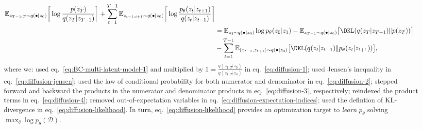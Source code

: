 \begin{align}
        \mathbb{E}_{z_{T-1:T} \sim q(\bullet \vert z_0)} \bigg[ \log \frac{p (z_T)}{q(z_T \vert z_{T-1})} \bigg] +
        \sum_{t=1}^{T-1} \mathbb{E}_{z_{t-1:t+1} \sim q(\bullet \vert z_0)} \bigg[ \log \frac{p_\theta (z_{t} \vert z_{t+1})}{q(z_t \vert z_{t-1})}\bigg]
    \label{eq:diffusion-expectation-indices} \\
    &= \mathbb{E}_{z_1 \sim q(\bullet \vert z_0)} \log p_\theta (z_0 \vert z_1) - \mathbb{E}_{z_{T-1} \sim q(\bullet \vert z_0)} \big[ \DKL (q(z_T \vert z_{T-1}) \Vert p(z_T) ) \big] \label{eq:diffusion-likelihood} \\
    &- \sum_{t=1}^{T-1} \mathbb{E}_{(z_{t-1}, z_{t+1}) \sim q(\bullet \vert z_0)} \big[ \DKL (q(z_t \vert z_{t-1}) \Vert p_\theta(z_t \vert z_{t+1}) ) \big], \notag
\end{align}
where we: used eq.~\ref{eq:BC-multi-latent-model-1} and multiplied by \( 1 = \tfrac{q(z_{1:T} \vert z_0)}{q(z_{1:T} \vert z_0)} \) in eq.~\ref{eq:diffusion-1}; used Jensen's inequality in eq.~\ref{eq:diffusion-jensen}; used the law of conditional probability for both numerator and denominator in eq.~\ref{eq:diffusion-2}; stepped forward and backward the products in the numerator and denominator products in eq.~\ref{eq:diffusion-3}, respectively; reindexed the product terms in eq.~\ref{eq:diffusion-4}; removed out-of-expectation variables in eq.~\ref{eq:diffusion-expectation-indices}; used the defintion of KL-divergence in eq.~\ref{eq:diffusion-likelihood}.
In turn, eq.~\ref{eq:diffusion-likelihood} provides an optimization target to \emph{learn} \( p_\theta \) solving \( \max_\theta \log p_\theta (\mathcal D) \).

